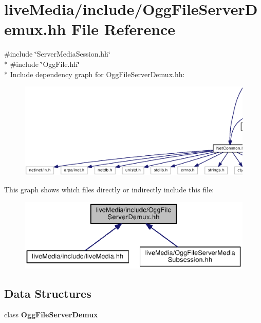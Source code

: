 \section{live\+Media/include/\+Ogg\+File\+Server\+Demux.hh File Reference}
\label{OggFileServerDemux_8hh}
{\ttfamily \#include \char`\"{}Server\+Media\+Session.\+hh\char`\"{}}\\*
{\ttfamily \#include \char`\"{}Ogg\+File.\+hh\char`\"{}}\\*
Include dependency graph for Ogg\+File\+Server\+Demux.\+hh\+:
\nopagebreak
\begin{figure}[H]
\begin{center}
\leavevmode
\includegraphics[width=350pt]{OggFileServerDemux_8hh__incl}
\end{center}
\end{figure}
This graph shows which files directly or indirectly include this file\+:
\nopagebreak
\begin{figure}[H]
\begin{center}
\leavevmode
\includegraphics[width=350pt]{OggFileServerDemux_8hh__dep__incl}
\end{center}
\end{figure}
\subsection*{Data Structures}
\begin{DoxyCompactItemize}
\item 
class {\bf Ogg\+File\+Server\+Demux}
\end{DoxyCompactItemize}
